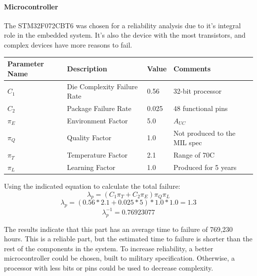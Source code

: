 \documentclass[12pt]{article}
\begin{document}
\paragraph{Microcontroller}
\par The STM32F072CBT6 was chosen for a reliability analysis due to it's integral role in the embedded system. It's also the device with the most transistors, and complex devices have more reasons to fail.
\begin{table}[htbp!]
\centering
\begin{tabular}{|l|l|l|l|}
\hline
Parameter Name & Description & Value & Comments \\ \hline
$C_1$ & Die Complexity Failure Rate & 0.56 & 32-bit processor \\ \hline
$C_2$ &  Package Failure Rate & 0.025 & 48 functional pins \\ \hline
$\pi_E$ & Environment Factor & 5.0 & $A_{UC}$ \\ \hline
$\pi_Q$ & Quality Factor & 1.0 & Not produced to the MIL spec \\ \hline
$\pi_T$ & Temperature Factor & 2.1 & Range of 70C \\ \hline
$\pi_L$ & Learning Factor & 1.0 & Produced for 5 years \\ \hline
\end{tabular}
\end{table}
\par Using the indicated equation to calculate the total failure:
\[ \lambda_p = (C_1\pi_T + C_2\pi_E) \pi_Q \pi_L\]
\[ \lambda_p = (0.56*2.1 + 0.025*5) * 1.0 * 1.0 = 1.3\]
\[ \lambda_p^{-1} = 0.76923077 \]
\par The results indicate that this part has an average time to failure of 769,230 hours. This is a reliable part, but the estimated time to failure is shorter than the rest of the components in the system. To increase reliability, a better microcontroller could be chosen, built to military specification. Otherwise, a processor with less bits or pins could be used to decrease complexity.
\end{document}
